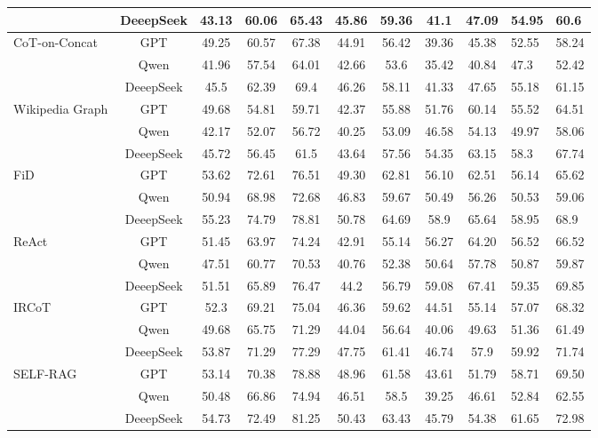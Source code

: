 \begin{table}[!htb]
\begin{threeparttable}
\begin{tabular}{|p{45pt}|c|c|c|c|c|c|c|c|p{30pt}|p{30pt}|}
        & DeeepSeek & 43.13 & 60.06 & 65.43 & 45.86 & 59.36 & 41.1 & 47.09 & 54.95 & 60.6 \\
        \hline
        \multirow{3}{40pt}{CoT-on-Concat} & GPT & 49.25 & 60.57 & 67.38 & 44.91 & 56.42 & 39.36 & 45.38 & 52.55 & 58.24\\
        & Qwen & 41.96 & 57.54 & 64.01 & 42.66 & 53.6 & 35.42 & 40.84 & 47.3 & 52.42\\
        & DeeepSeek & 45.5 & 62.39 & 69.4 & 46.26 & 58.11 & 41.33 & 47.65 & 55.18 & 61.15\\
        \hline
        \multirow{3}{40pt}{Wikipedia Graph} & GPT & 49.68 & 54.81 & 59.71 & 42.37 & 55.88 & 51.76 & 60.14 & 55.52 & 64.51\\
        & Qwen & 42.17 & 52.07 & 56.72 & 40.25 & 53.09 & 46.58 & 54.13 & 49.97 & 58.06\\
        & DeeepSeek & 45.72 & 56.45 & 61.5 & 43.64 & 57.56 & 54.35 & 63.15 & 58.3 & 67.74\\
        \hline
        \multirow{3}{40pt}{FiD} & GPT & 53.62 & 72.61 & 76.51 & 49.30 & 62.81 & 56.10 & 62.51 & 56.14 & 65.62\\
        & Qwen & 50.94 & 68.98 & 72.68 & 46.83 & 59.67 & 50.49 & 56.26 & 50.53 & 59.06\\
        & DeeepSeek & 55.23 & 74.79 & 78.81 & 50.78 & 64.69 & 58.9 & 65.64 & 58.95 & 68.9\\
        \hline
        \multirow{3}{40pt}{ReAct} & GPT & 51.45 & 63.97 & 74.24 & 42.91 & 55.14 & 56.27 & 64.20 & 56.52 & 66.52\\
        & Qwen & 47.51 & 60.77 & 70.53 & 40.76 & 52.38 & 50.64 & 57.78 & 50.87 & 59.87\\
        & DeeepSeek & 51.51 & 65.89 & 76.47 & 44.2 & 56.79 & 59.08 & 67.41 & 59.35 & 69.85\\
        \hline
        \multirow{3}{40pt}{IRCoT} & GPT & 52.3 & 69.21 & 75.04 & 46.36 & 59.62 & 44.51 & 55.14 & 57.07 & 68.32\\
        & Qwen & 49.68 & 65.75 & 71.29 & 44.04 & 56.64 & 40.06 & 49.63 & 51.36 & 61.49\\
        & DeeepSeek & 53.87 & 71.29 & 77.29 & 47.75 & 61.41 & 46.74 & 57.9 & 59.92 & 71.74\\
        \hline
        \multirow{3}{40pt}{SELF-RAG} & GPT & 53.14 & 70.38 & 78.88 & 48.96 & 61.58 & 43.61 & 51.79 & 58.71 & 69.50\\
        & Qwen & 50.48 & 66.86 & 74.94 & 46.51 & 58.5 & 39.25 & 46.61 & 52.84 & 62.55\\
        & DeeepSeek & 54.73 & 72.49 & 81.25 & 50.43 & 63.43 & 45.79 & 54.38 & 61.65 & 72.98\\

\end{tabular}
\end{threeparttable}
\end{table}
